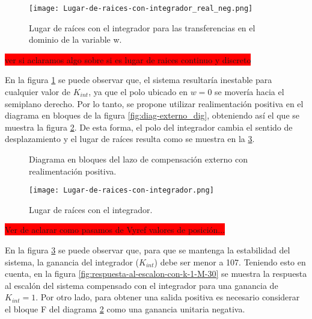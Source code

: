 \begin{figure}[H]
	\centering
	\texttt{[image: Lugar-de-raices-con-integrador\_real\_neg.png]}
	\caption{Lugar de raíces con el integrador para las transferencias en el dominio de la variable w.}
	\label{fig:lugar-de-raices-con-integrador_real_neg}
\end{figure}

\colorbox{red}{ver si aclaramos algo sobre si es lugar de raices continuo y discreto} 




En la figura \ref{fig:lugar-de-raices-con-integrador_real_neg} se puede observar que, el sistema resultaría inestable para cualquier valor de $K_{int}$, ya que el polo ubicado en $w=0$ se movería hacia el semiplano derecho. Por lo tanto, se propone utilizar realimentación positiva en el diagrama en bloques de la figura \ref{fig:diag-externo_dig}, obteniendo así el que se muestra la figura \ref{fig:diag-externo_real_positiva_dig}. De esta forma, el polo del integrador cambia el sentido de desplazamiento y el lugar de raíces resulta como se muestra en la \ref{fig:lugar-de-raices-con-integrador}.


\begin{figure}[H]
	\centering
	
	\caption{Diagrama en bloques del lazo de compensación externo con realimentación positiva.}	
	\label{fig:diag-externo_real_positiva_dig}
\end{figure}

\begin{figure}[H]
	\centering
	\texttt{[image: Lugar-de-raices-con-integrador.png]}
	\caption{Lugar de raíces con el integrador.}
	\label{fig:lugar-de-raices-con-integrador}
\end{figure}

\colorbox{red}{Ver de aclarar como pasamos de Vyref valores de posición...}

\noindent En la figura \ref{fig:lugar-de-raices-con-integrador} se puede observar que, para que se mantenga la estabilidad del sistema, la ganancia del integrador ($K_{int}$) debe ser menor a 107. Teniendo esto en cuenta, en la figura \ref{fig:respuesta-al-escalon-con-k-1-M-30} se muestra la respuesta al escalón del sistema compensado con el integrador para una ganancia de $K_{int}=1$. Por otro lado, para obtener una salida positiva es necesario considerar el bloque F del diagrama \ref{fig:diag-externo_real_positiva_dig} como una ganancia unitaria negativa.


